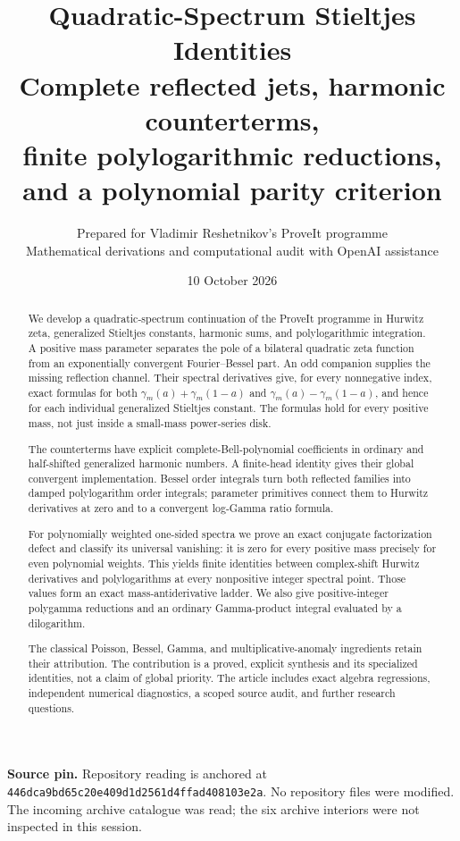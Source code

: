 \documentclass[11pt,letterpaper]{article}
\title{\textbf{Quadratic-Spectrum Stieltjes Identities}\\[7pt]
\large Complete reflected jets, harmonic counterterms,\\
finite polylogarithmic reductions, and a polynomial parity criterion}
\author{Prepared for Vladimir Reshetnikov's ProveIt programme\\
\small Mathematical derivations and computational audit with OpenAI assistance}
\date{10 October 2026}
\numberwithin{equation}{section}
\theoremstyle{definition}
\newcommand{\qpin}{\nolinkurl{446dca9bd65c20e409d1d2561d4ffad408103e2a}}
\begin{document}
\maketitle
\thispagestyle{plain}
\begin{abstract}
We develop a quadratic-spectrum continuation of the ProveIt programme in
Hurwitz zeta, generalized Stieltjes constants, harmonic sums, and polylogarithmic
integration. A positive mass parameter separates the pole of a bilateral
quadratic zeta function from an exponentially convergent Fourier--Bessel
part. An odd companion supplies the missing reflection channel. Their
spectral derivatives give, for every nonnegative index, exact formulas for
both $\gamma_m(a)+\gamma_m(1-a)$ and $\gamma_m(a)-\gamma_m(1-a)$, and hence
for each individual generalized Stieltjes constant. The formulas hold for
every positive mass, not just inside a small-mass power-series disk.

The counterterms have explicit complete-Bell-polynomial coefficients in
ordinary and half-shifted generalized harmonic numbers. A finite-head
identity gives their global convergent implementation. Bessel order
integrals turn both reflected families into damped polylogarithm order
integrals; parameter primitives connect them to Hurwitz derivatives at
zero and to a convergent log-Gamma ratio formula.

For polynomially weighted one-sided spectra we prove an exact conjugate
factorization defect and classify its universal vanishing: it is zero for
every positive mass precisely for even polynomial weights. This yields
finite identities between complex-shift Hurwitz derivatives and
polylogarithms at every nonpositive integer spectral point. Those values
form an exact mass-antiderivative ladder. We also give positive-integer
polygamma reductions and an ordinary Gamma-product integral evaluated by
a dilogarithm.

The classical Poisson, Bessel, Gamma, and multiplicative-anomaly ingredients
retain their attribution. The contribution is a proved, explicit synthesis
and its specialized identities, not a claim of global priority. The
article includes exact algebra regressions, independent numerical
diagnostics, a scoped source audit, and further research questions.
\end{abstract}
\medskip
\noindent\textbf{Source pin.} Repository reading is anchored at \qpin.
No repository files were modified. The incoming archive catalogue was read;
the six archive interiors were not inspected in this session.
\clearpage
\begingroup\small\tableofcontents\endgroup
\clearpage
\end{document}
